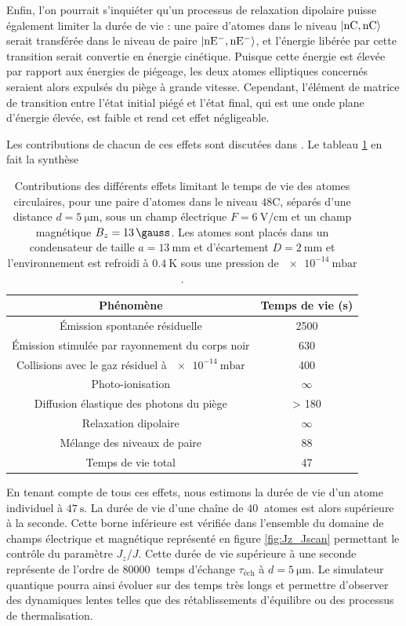Enfin, l'on pourrait s'inquiéter qu'un processus de relaxation dipolaire puisse également limiter la durée de vie : une paire d'atomes dans le niveau $\ket{\mathrm{nC,nC}}$ serait transférée dans le niveau de paire $\ket{\mathrm{nE^- , nE^-}}$, et l'énergie libérée par cette transition serait convertie en énergie cinétique. 
Puisque cette énergie est élevée par rapport aux énergies de piégeage, les deux atomes elliptiques concernés seraient alors expulsés du piège à grande vitesse.
Cependant, l'élément de matrice de transition entre l'état initial piégé et l'état final, qui est une onde plane d'énergie élevée, est faible et rend cet effet négligeable.


Les contributions de chacun de ces effets sont discutées dans \cite{ENS_PRE_CIRCSIM}.
Le tableau \ref{tab:lifetime_circsim} en fait la synthèse
%
\begin{table}[!h]
	\centering
	\caption[Contributions des différents effets limitant le temps de vie des atomes circulaires]{Contributions des différents effets limitant le temps de vie des atomes circulaires, pour une paire d'atomes dans le niveau $\mathrm{48C}$, séparés d'une distance $d=\SI{5}{\um}$, sous un champ électrique $F=\SI{6}{\V/\cm}$ et un champ magnétique $B_z=\SI{13}{\gauss}$.
	Les atomes sont placés dans un condensateur de taille $a=\SI{13}{\mm}$ et d'écartement $D=\SI{2}{\mm}$ et l'environnement est refroidi à $\SI{0.4}{\K}$ sous une pression de $\SI{e-14}{\milli\bar}$.
	}
	\label{tab:lifetime_circsim}
	\begin{tabular}{c c}
		\toprule\midrule
		Phénomène
		& Temps de vie (\si{\second})\\
		\midrule
		Émission spontanée résiduelle & \SI{2500}{} \\
		Émission stimulée par rayonnement du corps noir & \SI{630}{} \\
		Collisions avec le gaz résiduel à $\SI{e-14}{\milli\bar}$ & \SI{400}{} \\
		Photo-ionisation & $\infty$ \\
		Diffusion élastique des photons du piège & \SI{> 180}{} \\
		Relaxation dipolaire & $\infty$ \\
		Mélange des niveaux de paire & \SI{88}{} \\
		\midrule \midrule
		Temps de vie total & 47 \\
		\midrule \bottomrule
 	\end{tabular}
\end{table}
%
En tenant compte de tous ces effets, nous estimons la durée de vie d'un atome individuel à $\SI{47}{\second}$.
La durée de vie d'une chaîne de $\SI{40}{}$ atomes est alors supérieure à la seconde.
Cette borne inférieure est vérifiée dans l'ensemble du domaine de champs électrique et magnétique représenté en figure \ref{fig:Jz_Jscan} permettant le contrôle du paramètre $J_z/J$.
Cette durée de vie supérieure à une seconde représente de l'ordre de $\SI{80000}{}$ temps d'échange $\tau_{\text{éch}}$ à $d=\SI{5}{\um}$.
Le simulateur quantique pourra ainsi évoluer sur des temps très longs et permettre d'observer des dynamiques lentes telles que des rétablissements d'équilibre ou des processus de thermalisation.

